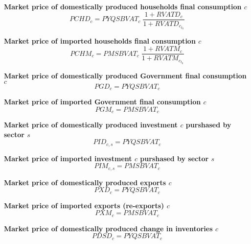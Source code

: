 \documentclass[12pt]{article}
\numberwithin{equation}{section}
\begin{document}
\noindent \textbf{Market price of domestically produced households final consumption $c$} 
\begin{dmath}
PCHD_{c} = PYQSBVAT_{c} \; \frac{1 + RVATD_{c}}{1 + RVATD_{c}_{t_0}}
\label{Exception_taxes_prices.mdlPCHD[c]}
\end{dmath}

\noindent \textbf{Market price of imported households final consumption $c$} 
\begin{dmath}
PCHM_{c} = PMSBVAT_{c} \; \frac{1 + RVATM_{c}}{1 + RVATM_{c}_{t_0}}
\label{Exception_taxes_prices.mdlPCHM[c]}
\end{dmath}

\noindent \textbf{Market price of domestically produced Government final consumption $c$} 
\begin{dmath}
PGD_{c} = PYQSBVAT_{c}
\label{Exception_taxes_prices.mdlPGD[c]}
\end{dmath}

\noindent \textbf{Market price of imported Government final consumption $c$} 
\begin{dmath}
PGM_{c} = PMSBVAT_{c}
\label{Exception_taxes_prices.mdlPGM[c]}
\end{dmath}

\noindent \textbf{Market price of domestically produced investment $c$ purshased by sector $s$} 
\begin{dmath}
PID_{c, s} = PYQSBVAT_{c}
\label{Exception_taxes_prices.mdlPID[c, s]}
\end{dmath}

\noindent \textbf{Market price of imported investment $c$ purshased by sector $s$} 
\begin{dmath}
PIM_{c, s} = PMSBVAT_{c}
\label{Exception_taxes_prices.mdlPIM[c, s]}
\end{dmath}

\noindent \textbf{Market price of domestically produced exports $c$} 
\begin{dmath}
PXD_{c} = PYQSBVAT_{c}
\label{Exception_taxes_prices.mdlPXD[c]}
\end{dmath}

\noindent \textbf{Market price of imported exports (re-exports) $c$} 
\begin{dmath}
PXM_{c} = PMSBVAT_{c}
\label{Exception_taxes_prices.mdlPXM[c]}
\end{dmath}

\noindent \textbf{Market price of domestically produced change in inventories $c$} 
\begin{dmath}
PDSD_{c} = PYQSBVAT_{c}
\label{Exception_taxes_prices.mdlPDSD[c]}
\end{dmath}
\end{document}
